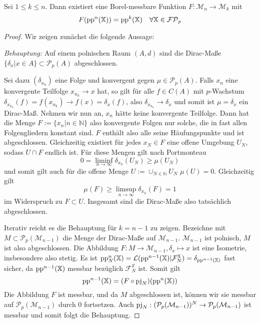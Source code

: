     \begin{lemma}\label{thm:stepback_pp} %
        Sei $1\leq k\leq n$. Dann existiert eine Borel-messbare Funktion $F:\mathcal{M}_n\rightarrow \mathcal{M}_k$ mit 
        $$F(\operatorname{pp}^n(\mathbb{X})) = \operatorname{pp}^k(\mathbb{X}) \quad \forall \mathbb{X} \in \mathcal{FP}_p$$
    \end{lemma}
    \begin{proof}
        Wir zeigen zunächst die folgende Aussage:

        \emph{Behauptung:} Auf einem polnischen Raum $(A, d)$ sind die Dirac-Maße $\{\delta_x \vert x\in A\} \subset \mathcal{P}_p(A)$ abgeschlossen.

        Sei dazu $\left(\delta_{x_n}\right)$ eine Folge und konvergent gegen $\mu \in \mathcal{P}_p(A)$. Falls $x_n$ eine konvergente Teilfolge $x_{n_k} \rightarrow x$ hat, so gilt für alle $f \in C(A)$ mit $p$-Wachstum $\delta_{x_{n_k}}(f)=f(x_{n_k})\rightarrow f(x)=\delta_x(f)$, also $\delta_{x_{n_k}}\rightarrow \delta_x$ und somit ist $\mu = \delta_x$ ein Dirac-Maß. Nehmen wir nun an, $x_n$ hätte keine konvergente Teilfolge. Dann hat die Menge $F:=\{x_n \vert n \in \mathbb{N}\}$ also konvergente Folgen nur solche, die in fast allen Folgengliedern konstant sind. $F$ enthält also alle seine Häufungspunkte und ist abgeschlossen. Gleichzeitig existiert für jedes $x_N \in F$ eine offene Umgebung $U_N$, sodass $U\cap F$ endlich ist. Für diese Mengen gilt nach Portmonteau
        $$0 = \liminf_{n\rightarrow \infty} \delta_{x_n}(U_N) \geq \mu(U_N)$$
        und somit gilt auch für die offene Menge $U:=\cup_{N\in\mathbb{N}} U_N$ $\mu(U)=0$. Gleichzeitig gilt
        $$\mu(F) \geq \limsup_{n\rightarrow \infty} \delta_{x_n}(F)=1$$
        im Widerspruch zu $F \subset U$. Insgesamt sind die Dirac-Maße also tatsächlich abgeschlossen.

        Iterativ reicht es die Behauptung für $k=n-1$ zu zeigen. Bezeichne mit $M\subset \mathcal{P}_p(\mathcal{M}_{n-1})$ die Menge der Dirac-Maße auf $\mathcal{M}_{n-1}$. $\mathcal{M}_{n-1}$ ist polnisch, $M$ ist also abgeschlossen. Die Abbildung $F: M \rightarrow \mathcal{M}_{n-1}, \delta_x \mapsto x$ ist eine Isometrie, insbesondere also stetig. Es ist $\operatorname{pp}^n_N(\mathbb{X}) = \mathcal{L}(\operatorname{pp}^{n-1}(\mathbb{X})\vert \mathcal{F}_N^\mathbb{X}) = \delta_{\operatorname{pp}^{n-1}(\mathbb{X})}$ fast sicher, da $\operatorname{pp}^{n-1}(\mathbb{X})$ messbar bezüglich $\mathcal{F}_N^{\mathbb{X}}$ ist. Somit gilt 
        $$\operatorname{pp}^{n-1}(\mathbb{X}) = (F\circ \operatorname{pj}_N)(\operatorname{pp}^n(\mathbb{X}))$$
        Die Abbildung $F$ ist messbar, und da $M$ abgeschlossen ist, können wir sie messbar auf $\mathcal{P}_p(\mathcal{M}_{n-1})$ durch 0 fortsetzen. Auch $\operatorname{pj}_N:(\mathcal{P}_p(\mathcal{M}_{n-1}))^N \rightarrow \mathcal{P}_p(\mathcal{M}_{n-1})$ ist messbar und somit folgt die Behauptung.
    \end{proof}
